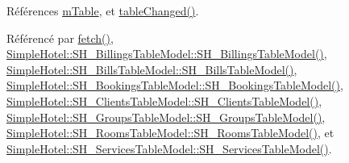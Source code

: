 Références \hyperlink{classSimpleHotel_1_1SH__SqlDataModel_a567dcf9f5f9088ef90238d86272b3121}{m\-Table}, et \hyperlink{classSimpleHotel_1_1SH__SqlDataModel_af1dc4861b6a6b1b66071afc8392054df}{table\-Changed()}.



Référencé par \hyperlink{classSimpleHotel_1_1SH__SqlDataModel_ab8b74a08f668025c11c5446d4e4b469b}{fetch()}, \hyperlink{classSimpleHotel_1_1SH__BillingsTableModel_a7fb58cc51b7cb54488f73d7425661afb}{Simple\-Hotel\-::\-S\-H\-\_\-\-Billings\-Table\-Model\-::\-S\-H\-\_\-\-Billings\-Table\-Model()}, \hyperlink{classSimpleHotel_1_1SH__BillsTableModel_a1a0bc03bb16c331703298d9a2e16d1c5}{Simple\-Hotel\-::\-S\-H\-\_\-\-Bills\-Table\-Model\-::\-S\-H\-\_\-\-Bills\-Table\-Model()}, \hyperlink{classSimpleHotel_1_1SH__BookingsTableModel_a45ee2def6c6569d7e04c0c3af88c7b5f}{Simple\-Hotel\-::\-S\-H\-\_\-\-Bookings\-Table\-Model\-::\-S\-H\-\_\-\-Bookings\-Table\-Model()}, \hyperlink{classSimpleHotel_1_1SH__ClientsTableModel_a77b19f062eabb619be2219c099da3834}{Simple\-Hotel\-::\-S\-H\-\_\-\-Clients\-Table\-Model\-::\-S\-H\-\_\-\-Clients\-Table\-Model()}, \hyperlink{classSimpleHotel_1_1SH__GroupsTableModel_a55ac3cd4b77c2abe11186437829860d2}{Simple\-Hotel\-::\-S\-H\-\_\-\-Groups\-Table\-Model\-::\-S\-H\-\_\-\-Groups\-Table\-Model()}, \hyperlink{classSimpleHotel_1_1SH__RoomsTableModel_a3e4ef51e6a16172de3cc5658c98a8793}{Simple\-Hotel\-::\-S\-H\-\_\-\-Rooms\-Table\-Model\-::\-S\-H\-\_\-\-Rooms\-Table\-Model()}, et \hyperlink{classSimpleHotel_1_1SH__ServicesTableModel_a109c343989f5fec1ed380c2bcc50c432}{Simple\-Hotel\-::\-S\-H\-\_\-\-Services\-Table\-Model\-::\-S\-H\-\_\-\-Services\-Table\-Model()}.


